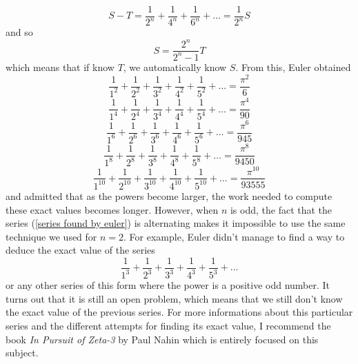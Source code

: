 $$S - T = \frac{1}{2^{n}} + \frac{1}{4^{n}} + \frac{1}{6^{n}} + \dots = \frac{1}{2^{n}}S$$
and so
$$S = \frac{2^n}{2^n - 1}T$$
which means that if know $T$, we automatically know $S$. From this, Euler obtained
\begin{equation} \label{zeta-2}
    \frac{1}{1^2} + \frac{1}{2^2} + \frac{1}{3^2} + \frac{1}{4^2} + \frac{1}{5^2} + \dots = \frac{\pi^2}{6}
\end{equation}
\begin{equation} \label{zeta-4}
    \frac{1}{1^4} + \frac{1}{2^4} + \frac{1}{3^4} + \frac{1}{4^4} + \frac{1}{5^4} + \dots = \frac{\pi^4}{90}
\end{equation}
\begin{equation} \label{zeta-6}
    \frac{1}{1^6} + \frac{1}{2^6} + \frac{1}{3^6} + \frac{1}{4^6} + \frac{1}{5^6} + \dots = \frac{\pi^6}{945}
\end{equation}
\begin{equation} \label{zeta-8}
    \frac{1}{1^8} + \frac{1}{2^8} + \frac{1}{3^8} + \frac{1}{4^8} + \frac{1}{5^8} + \dots = \frac{\pi^8}{9450}
\end{equation}
\begin{equation} \label{zeta-10}
    \frac{1}{1^{10}} + \frac{1}{2^{10}} + \frac{1}{3^{10}} + \frac{1}{4^{10}} + \frac{1}{5^{10}} + \dots = \frac{\pi^{10}}{93555}
\end{equation}
and admitted that as the powers become larger, the work needed to compute these exact values becomes longer. However, when $n$ is odd, the fact that the series (\ref{series found by euler}) is alternating makes it impossible to use the same technique we used for $n=2$. For example, Euler didn't manage to find a way to deduce the exact value of the series
$$\frac{1}{1^3} + \frac{1}{2^3} + \frac{1}{3^3} + \frac{1}{4^3} + \frac{1}{5^3} + \dots$$
or any other series of this form where the power is a positive odd number. It turns out that it is still an open problem, which means that we still don't know the exact value of the previous series. For more informations about this particular series and the different attempts for finding its exact value, I recommend the book \textit{In Pursuit of Zeta-3} by Paul Nahin \cite{pursuitZeta3} which is entirely focused on this subject. 

